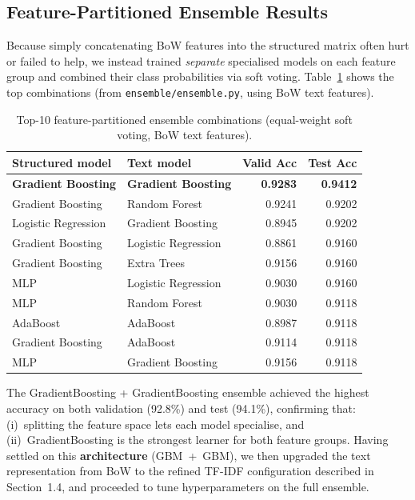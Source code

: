 \documentclass[11pt,letterpaper]{article}
\begin{document}
\subsection{Feature-Partitioned Ensemble Results}

Because simply concatenating BoW features into the structured matrix often
hurt or failed to help, we instead trained \emph{separate} specialised models
on each feature group and combined their class probabilities via soft voting.
Table~\ref{tab:ens} shows the top combinations (from \texttt{ensemble/ensemble.py},
using BoW text features).

\begin{table}[H]
\centering
\caption{Top-10 feature-partitioned ensemble combinations (equal-weight soft voting,
BoW text features).}
\label{tab:ens}
\begin{tabular}{llrr}
\toprule
\textbf{Structured model} & \textbf{Text model} & \textbf{Valid Acc} & \textbf{Test Acc}\\
\midrule
\textbf{Gradient Boosting} & \textbf{Gradient Boosting} & \textbf{0.9283} & \textbf{0.9412}\\
Gradient Boosting & Random Forest     & 0.9241 & 0.9202 \\
Logistic Regression & Gradient Boosting & 0.8945 & 0.9202 \\
Gradient Boosting & Logistic Regression & 0.8861 & 0.9160 \\
Gradient Boosting & Extra Trees       & 0.9156 & 0.9160 \\
MLP               & Logistic Regression & 0.9030 & 0.9160 \\
MLP               & Random Forest     & 0.9030 & 0.9118 \\
AdaBoost          & AdaBoost          & 0.8987 & 0.9118 \\
Gradient Boosting & AdaBoost          & 0.9114 & 0.9118 \\
MLP               & Gradient Boosting & 0.9156 & 0.9118 \\
\bottomrule
\end{tabular}
\end{table}

The GradientBoosting + GradientBoosting ensemble achieved the highest accuracy on
both validation (92.8\%) and test (94.1\%), confirming that: (i)~splitting the
feature space lets each model specialise, and (ii)~GradientBoosting is the
strongest learner for both feature groups. Having settled on this
\textbf{architecture} (GBM~+~GBM), we then upgraded the text representation from
BoW to the refined TF-IDF configuration described in Section~1.4, and proceeded
to tune hyperparameters on the full ensemble.
\end{document}
